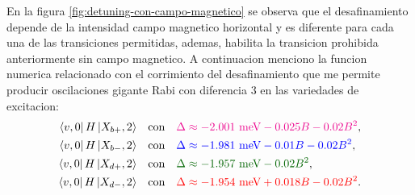\documentclass[main.tex]{subfiles}
\begin{document}
En la figura \ref{fig:detuning-con-campo-magnetico} se observa que el desafinamiento depende de la intensidad campo magnetico horizontal y es diferente para cada una de las transiciones permitidas, ademas, habilita la transicion prohibida anteriormente sin campo magnetico. A continuacion menciono la funcion numerica relacionado con el corrimiento del desafinamiento que me permite producir oscilaciones gigante Rabi con diferencia 3 en las variedades de excitacion:
\begin{align}
	\bra{v,0}H\ket{X_{b+},2} &\quad \text{con} \quad \textcolor{magenta}{\Delta \approx -2.001\text{ meV} - 0.025B - 0.02B^2},\\
	\bra{v,0}H\ket{X_{b-},2} &\quad \text{con} \quad \textcolor{blue}{\Delta \approx -1.981\text{ meV} - 0.01B - 0.02B^2},\\
	\bra{v,0}H\ket{X_{d+},2} &\quad \text{con} \quad \textcolor{darkgreen}{\Delta \approx -1.957\text{ meV} - 0.02B^2},\\
	\bra{v,0}H\ket{X_{d-},2} &\quad \text{con} \quad \textcolor{red}{\Delta \approx -1.954\text{ meV} + 0.018B - 0.02B^2}.
\end{align}
%
\end{document}
